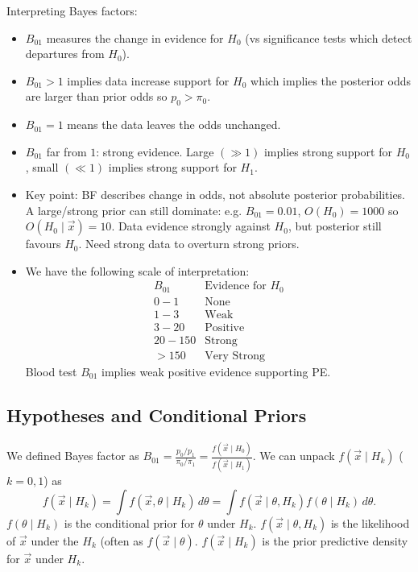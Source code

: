 \documentclass[10pt, a4paper]{article}
\begin{document}
Interpreting Bayes factors:
\begin{itemize}
    \item $B_{01}$ measures the change in evidence for $H_0$
    (vs significance tests which detect departures from $H_0$).

    \item $B_{01} > 1$ implies data increase support for $H_0$ which implies the posterior odds are larger than prior odds so $p_0 > \pi_0$.

    \item $B_{01} = 1$ means the data leaves the odds unchanged.

    \item $B_{01}$ far from $1$:
    strong evidence.
    Large $(\gg 1)$ implies strong support for $H_0$,
    small $(\ll 1)$ implies strong support for $H_1$.

    \item Key point:
    BF describes change in odds,
    not absolute posterior probabilities.
    A large/strong prior can still dominate:
    e.g. $B_{01} = 0.01$,
    $O(H_0) = 1000$ so $O(H_0 \mid \vec{x}) = 10$.
    Data evidence strongly against $H_0$,
    but posterior still favours $H_0$.
    Need strong data to overturn strong priors.

    \item We have the following scale of interpretation:
    \[
    \begin{array}{c|c}
         B_{01} & \text{Evidence for $H_0$} \\
         \hline
         0 - 1 & \text{None} \\
         1 - 3 & \text{Weak} \\
         3 - 20 & \text{Positive} \\
         20 - 150 & \text{Strong} \\
         > 150 & \text{Very Strong}
    \end{array}
    \]
    Blood test $B_{01}$ implies weak positive evidence supporting PE.
\end{itemize}

\subsection{Hypotheses and Conditional Priors}
We defined Bayes factor as $B_{01} = \frac{p_0 / p_1}{\pi_0 / \pi_1} = \frac{f(\vec{x} \mid H_0)}{f(\vec{x} \mid H_1)}$.
We can unpack $f(\vec{x} \mid H_k)$ 
($k = 0, 1$)
as
\[
f(\vec{x} \mid H_k) = \int f(\vec{x}, \theta \mid H_k)\,d\theta = \int f(\vec{x} \mid \theta, H_k)f(\theta \mid H_k)\,d\theta.
\]
$f(\theta \mid H_k)$ is the conditional prior for $\theta$ under $H_k$.
$f(\vec{x} \mid \theta, H_k)$ is the likelihood of $\vec{x}$ under the $H_k$
(often as $f(\vec{x} \mid \theta)$.
$f(\vec{x} \mid H_k)$ is the prior predictive density for $\vec{x}$ under $H_k$.
\end{document}
